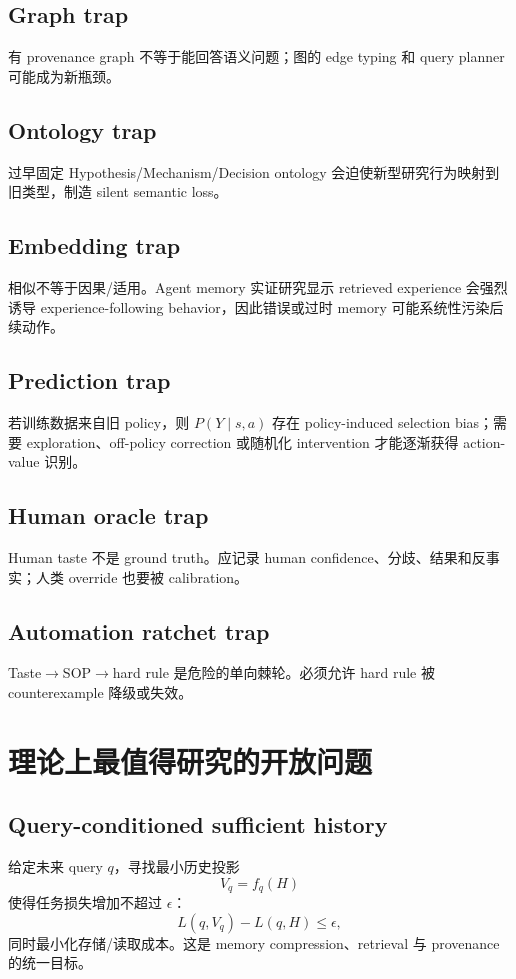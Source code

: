 \documentclass[11pt,a4paper]{ctexart}
\begin{document}
\subsection{Graph trap}
有 provenance graph 不等于能回答语义问题；图的 edge typing 和 query planner 可能成为新瓶颈。

\subsection{Ontology trap}
过早固定 Hypothesis/Mechanism/Decision ontology 会迫使新型研究行为映射到旧类型，制造 silent semantic loss。

\subsection{Embedding trap}
相似不等于因果/适用。Agent memory 实证研究显示 retrieved experience 会强烈诱导 experience-following behavior，因此错误或过时 memory 可能系统性污染后续动作\parencite{xiong2026experience}。

\subsection{Prediction trap}
若训练数据来自旧 policy，则 $P(Y\mid s,a)$ 存在 policy-induced selection bias；需要 exploration、off-policy correction 或随机化 intervention 才能逐渐获得 action-value 识别。

\subsection{Human oracle trap}
Human taste 不是 ground truth。应记录 human confidence、分歧、结果和反事实；人类 override 也要被 calibration。

\subsection{Automation ratchet trap}
Taste$\to$SOP$\to$hard rule 是危险的单向棘轮。必须允许 hard rule 被 counterexample 降级或失效。

\section{理论上最值得研究的开放问题}

\subsection{Query-conditioned sufficient history}
给定未来 query $q$，寻找最小历史投影
\begin{equation}
 V_q=f_q(H)
\end{equation}
使得任务损失增加不超过 $\epsilon$：
\begin{equation}
 L(q,V_q)-L(q,H)\le\epsilon,
\end{equation}
同时最小化存储/读取成本。这是 memory compression、retrieval 与 provenance 的统一目标。
\end{document}
